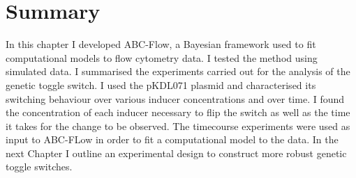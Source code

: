 \section{Summary}


In this chapter I developed ABC-Flow, a Bayesian framework used to fit computational models to flow cytometry data. I tested the method using simulated data. I summarised the experiments carried out for the analysis of the genetic toggle switch. I used the pKDL071 plasmid and characterised its switching behaviour over various inducer concentrations and over time. I found the concentration of each inducer necessary to flip the switch as well as the time it takes for the change to be observed. The timecourse experiments were used as input to ABC-FLow in order to fit a computational model to the data. In the next Chapter I outline an experimental design to construct more robust genetic toggle switches.







 
 